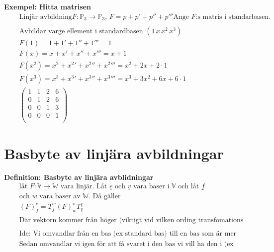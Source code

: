 \textbf{Exempel: Hitta matrisen}
\begin{align*}
  &\quad  \text{Linjär avbildning} F:\mathbb{P}_3\to\mathbb{P}_3, \, F= p+ p'+ p''+ p'''
  \text{Ange $F$:s matris i standarbasen.} \\
  &\quad  \\
  &\quad  \text{Avbildar varge ellement i standardbasen } (1 \, x \, x^2 \, x^3) \\
  &\quad  F(1) = 1 + 1' + 1'' + 1''' = 1 \\
  &\quad  F(x) = x + x' + x'' + x''' = x+1 \\
  &\quad  F(x^2) = {x^2} + {x^2}' + {x^2}'' + {x^2}''' = x^2 + 2x + 2\cdot1 \\
  &\quad  F(x^3) = {x^3} + {x^3}' + {x^3}'' + {x^3}''' = x^3 + 3x^2 + 6x + 6\cdot1 \\
  &\quad
  \left(\begin{array}{cccc}
    1 & 1 & 2 & 6 \\
    0 & 1 & 2 & 6 \\
    0 & 0 & 1 & 3 \\
    0 & 0 & 0 & 1 \\
  \end{array}\right)   
\end{align*}


\newpage

\section{Basbyte av linjära avbildningar}
\textbf{Definition: Basbyte av linjära avblidningar}
\begin{align*}
  &\quad  \text{låt $F: \mathbb{V}\to\mathbb{W}$ vara linjär. Låt $\underline{e}$ och
    $\underline{v}$ vara baser i $\mathbb{V}$ och låt $\underline{f}$} \\
  &\quad  \text{och $\underline{w}$ vara baser av $\mathbb{W}$. Då gäller}  \\
  &\quad   {(F)}^{\underline{e}}_{\underline{f}} =
  T^{\underline{w}}_{\underline{f}}{(F)}^{\underline{v}}_{\underline{w}}T^{\underline{e}}_{\underline{v}} \\
  &\quad   \text{Där vektorn kommer från höger (viktigt vid vilken
    ording transfomations matriserna står)} \\
  &\quad   \\
  &\quad  \text{Ide: Vi omvandlar från en bas (ex standard bas) till en bas som
    är mer anpasat för uträkningen} \\
  &\quad  \text{Sedan omvandlar vi igen för att få svaret i den bas vi vill ha
    den i (ex standard bas)} \\
\end{align*}

